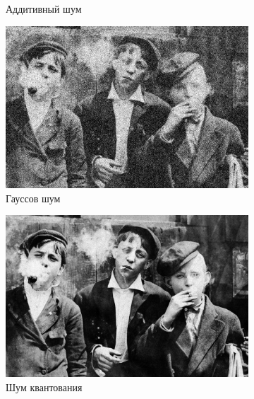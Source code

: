 \begin{figure}[ht!]
\begin{subfigure}[b]{0.5\linewidth}
    \caption{Аддитивный шум} 
    \vspace{4ex}
  \end{subfigure}%
  \begin{subfigure}[b]{0.5\linewidth}
    \centering
    \includegraphics[width=0.95\linewidth]{../Adaptive_Median_Filter/Adaptive_Median_Gaussian_noise_k=9.jpg} 
    \caption{Гауссов шум} 
    \vspace{4ex}
  \end{subfigure}
  \begin{subfigure}[b]{0.5\linewidth}
    \centering
    \includegraphics[width=0.95\linewidth]{../Adaptive_Median_Filter/Adaptive_Median_Poisson_noise_k=9.jpg} 
    \caption{Шум квантования} 
  \end{subfigure}%
  \begin{subfigure}[b]{0.5\linewidth}
      \centering

\end{subfigure}
\end{figure}
